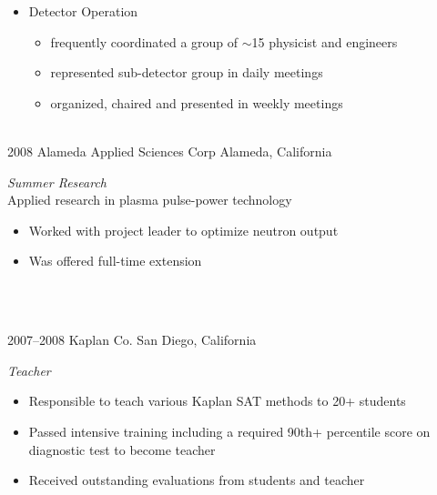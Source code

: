 \documentclass[]{friggeri-cv} %
\begin{document}
\begin{entrylist}
{\begin{itemize}
\begin{itemize}
\begin{itemize}
  \end{itemize}      
\item integral part of fast-paced analysis group
\item contributed to the discovery of the Higgs Boson 
\end{itemize}
\item Detector Operation
\begin{itemize}
\item frequently coordinated a group of $\sim$15 physicist and engineers
\item represented sub-detector group in daily meetings
\item organized, chaired and presented in weekly meetings
\end{itemize}
\end{itemize}}
~~\\
\entry
{2008}
{Alameda Applied Sciences Corp}
{Alameda, California}
{\emph{Summer Research} \\
Applied research in plasma pulse-power technology
\begin{itemize}
\item Worked with project leader to optimize neutron output
\item Was offered full-time extension
\end{itemize}}
\end{entrylist}
~\\
\begin{entrylist}
~\\
\entry
{2007--2008} 
{Kaplan Co.}
{San Diego, California}
{\emph{Teacher} 
\begin{itemize} 
\item Responsible to teach various Kaplan SAT methods to 20+ students
\item Passed intensive training including a required 90th+ percentile score on diagnostic test to become
teacher
\item Received outstanding evaluations from students and teacher
\end{itemize}
}

~\\
\end{entrylist}
\end{document}
